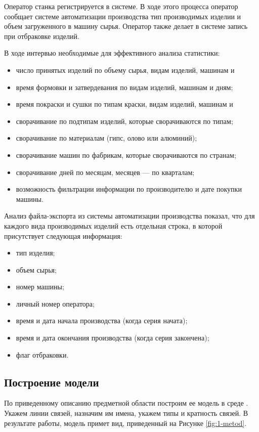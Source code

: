 Оператор станка регистрируется в системе. В ходе этого процесса оператор
сообщает системе автоматизации производства тип производимых изделии и
объем загруженного в машину сырья. Оператор также делает в системе запись
при отбраковке изделий.

В ходе
интервью необходимые для эффективного анализа статистики:
\begin{itemize}
	
	\item  число принятых изделий по объему сырья, видам изделий, машинам и
	\item  время формовки и затвердевания по видам изделий, машинам и дням;
	\item  время покраски и сушки по типам краски, видам изделий, машинам и
	\item  сворачивание по подтипам изделий, которые сворачиваются по типам;
	\item  сворачивание по материалам (гипс, олово или алюминий);
	\item  сворачивание машин по фабрикам, которые сворачиваются по странам;
	\item  сворачивание дней по месяцам, месяцев — по кварталам;
	\item  возможность фильтрации информации по производителю и дате покупки машины.
\end{itemize}

Анализ файла-экспорта из системы автоматизации производства показал,
что для каждого вида производимых изделий есть отдельная строка, в которой
присутствует следующая информация:
\begin{itemize}
	\item  тип изделия;
	\item  объем сырья;
	\item  номер машины;
	\item  личный номер оператора;
	\item  время и дата начала производства (когда серия начата);
	\item  время и дата окончания производства (когда серия закончена);
	\item  флаг отбраковки.
\end{itemize}
\subsection{Построение модели}
По приведенному описанию предметной области построим ее модель в среде \erassistant. Укажем линии связей, назначим им имена, укажем типы и кратность связей. В результате работы, модель примет вид, приведенный на Рисунке \ref{fig:1-metod}.

